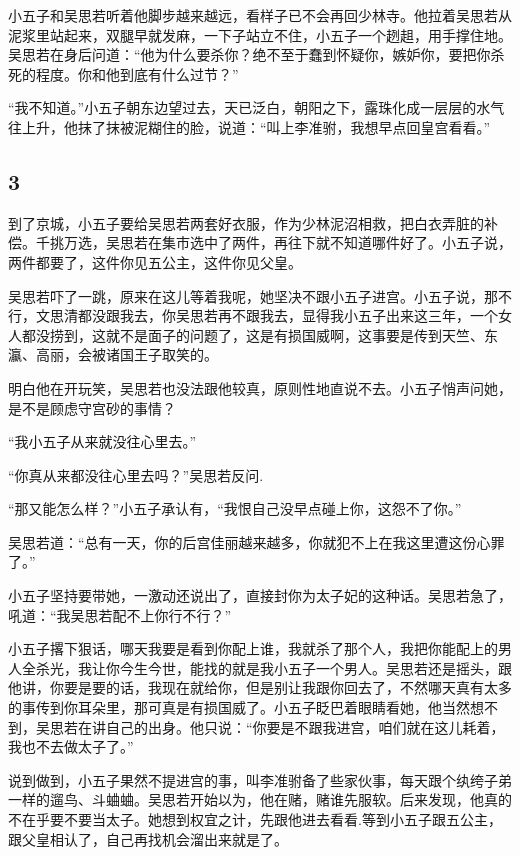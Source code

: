 小五子和吴思若听着他脚步越来越远，看样子已不会再回少林寺。他拉着吴思若从泥浆里站起来，双腿早就发麻，一下子站立不住，小五子一个趔趄，用手撑住地。吴思若在身后问道：“他为什么要杀你？绝不至于蠢到怀疑你，嫉妒你，要把你杀死的程度。你和他到底有什么过节？”

“我不知道。”小五子朝东边望过去，天已泛白，朝阳之下，露珠化成一层层的水气往上升，他抹了抹被泥糊住的脸，说道：“叫上李准驸，我想早点回皇宫看看。”
\newline

{\centering\subsection{3}}

到了京城，小五子要给吴思若两套好衣服，作为少林泥沼相救，把白衣弄脏的补偿。千挑万选，吴思若在集市选中了两件，再往下就不知道哪件好了。小五子说，两件都要了，这件你见五公主，这件你见父皇。

吴思若吓了一跳，原来在这儿等着我呢，她坚决不跟小五子进宫。小五子说，那不行，文思清都没跟我去，你吴思若再不跟我去，显得我小五子出来这三年，一个女人都没捞到，这就不是面子的问题了，这是有损国威啊，这事要是传到天竺、东瀛、高丽，会被诸国王子取笑的。

明白他在开玩笑，吴思若也没法跟他较真，原则性地直说不去。小五子悄声问她，是不是顾虑守宫砂的事情？

“我小五子从来就没往心里去。”

“你真从来都没往心里去吗？”吴思若反问.

“那又能怎么样？”小五子承认有，“我恨自己没早点碰上你，这怨不了你。”

吴思若道：“总有一天，你的后宫佳丽越来越多，你就犯不上在我这里遭这份心罪了。”

小五子坚持要带她，一激动还说出了，直接封你为太子妃的这种话。吴思若急了，吼道：“我吴思若配不上你行不行？”

小五子撂下狠话，哪天我要是看到你配上谁，我就杀了那个人，我把你能配上的男人全杀光，我让你今生今世，能找的就是我小五子一个男人。吴思若还是摇头，跟他讲，你要是要的话，我现在就给你，但是别让我跟你回去了，不然哪天真有太多的事传到你耳朵里，那可真是有损国威了。小五子眨巴着眼睛看她，他当然想不到，吴思若在讲自己的出身。他只说：“你要是不跟我进宫，咱们就在这儿耗着，我也不去做太子了。”

说到做到，小五子果然不提进宫的事，叫李准驸备了些家伙事，每天跟个纨绔子弟一样的遛鸟、斗蛐蛐。吴思若开始以为，他在赌，赌谁先服软。后来发现，他真的不在乎要不要当太子。她想到权宜之计，先跟他进去看看.等到小五子跟五公主，跟父皇相认了，自己再找机会溜出来就是了。

